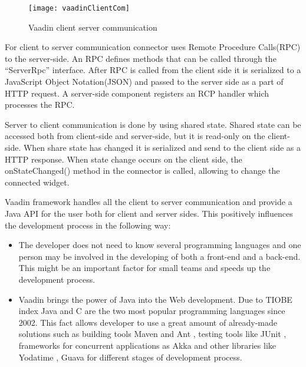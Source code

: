 	  \begin{figure}
      	\texttt{[image: vaadinClientCom]}
      	\caption{Vaadin client server communication}
      	\label{fig:vaadinClientCom}
      \end{figure}
      
   For client to server communication connector uses Remote Procedure
   Calls(RPC) to the server-side. An RPC defines methods that can be called
   through the ``ServerRpc'' interface. After RPC is called from the client side
   it is serialized to a JavaScript Object Notation(JSON) and passed to the
   server side as a part of HTTP request. A server-side component registers an
   RCP handler which processes the RPC. 
   
   Server to client communication is done by using shared
   state. Shared state can be accessed both from client-side and server-side,
   but it is read-only on the client-side. When share state has changed it is
   serialized and send to the client side as a HTTP response. When state change
   occurs on the client side, the onStateChanged() method in the connector is called,
   allowing to change the connected widget.
   
  
   Vaadin framework handles all the client to server communication and provide
   a Java API for the user both for client and server sides. This positively
    influences the development process in the following way:
   \begin{itemize}
     \item The developer does not need to know several programming languages and one
    person may be involved in the developing of both a front-end and a back-end.
    This might be an important factor for small teams and speeds up the development
    process.
   \item Vaadin brings the power of Java into the Web development. Due to
    TIOBE index \cite{tiobeIndex} Java and C are the two most popular programming
    languages since 2002. This fact allows developer to use a great amount of
    already-made solutions such as building tools Maven \cite{maven} and Ant
    \cite{ant}, testing tools like JUnit \cite{junit}, frameworks for concurrent
    applications as Akka \cite{akka} and other libraries like Yodatime \cite{yodatime}, Guava \cite{guava} for different stages of development
    process.
  \end{itemize}  		
		

